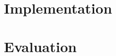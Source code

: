 \documentclass[a4paper]{article}
\begin{document}
	\section{Implementation}


	\section{Evaluation}

\end{document}
